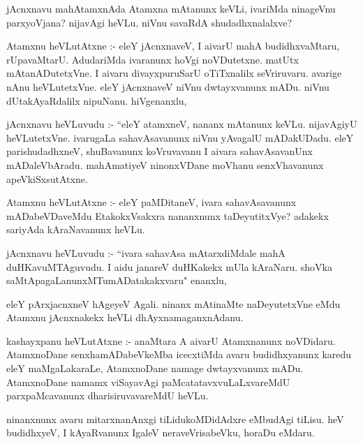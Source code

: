 \documentclass{article}
\begin{document}
\begin{mn}
jAcnxnavu mahAtamxnAda Atamxna mAtanunx keVLi, ivariMda ninageVnu parxyoVjana?
 nijavAgi heVLu, niVnu savaRdA shudadhxnalalxve?
\end{mn}

\begin{mn}Atamxnu heVLutAtxne :- eleY jAcnxnaveV, I aivarU mahA budidhxvaMtaru, 
rUpavaMtarU.  AdudariMda ivaranunx hoVgi noVDutetxne. matUtx mAtanADutetxVne.  
I aivaru divayxpuruSarU oTiTxnalilx seVriruvaru. avarige nAnu heVLutetxVne. 
 eleY jAcnxnaveV niVnu  dwtayxvanunx mADu. niVnu dUtakAyaRdalilx nipuNanu. hiVgenanxlu,
\end{mn}

\begin{mn}
jAcnxnavu heVLuvudu :- ``eleY atamxneV, nananx mAtanunx keVLu. nijavAgiyU
 heVLutetxVne.  ivarugaLa sahavAsavanunx niVnu yAvagalU mADakUDadu.  eleY 
 parishudadhxneV, shuBavanunx koVruvavanu I aivara sahavAsavanUnx  mADaleVbAradu.
  mahAmatiyeV ninonxVDane moVhanu senxVhavanunx apeVkiSxsutAtxne.
\end{mn}

\begin{mn}
Atamxnu heVLutAtxne :- eleY paMDitaneV, ivara  sahavAsavanunx mADabeVDaveMdu 
EtakokxVsakxra  nananxnunx taDeyutitxVye? adakekx sariyAda kAraNavanunx heVLu.
\end{mn}

\begin{mn}
jAcnxnavu heVLuvudu :- ``ivara   sahavAsa mAtarxdiMdale mahA duHKavuMTAguvudu.
 I aidu janareV duHKakekx mUla kAraNaru. shoVka saMtApagaLanunxMTumADatakakxvaru" enanxlu,
\end{mn}

\begin{mn}
eleY pArxjacnxneV hAgeyeV Agali. ninanx mAtinaMte naDeyutetxVne eMdu Atamxnu 
jAcnxnakekx heVLi dhAyxnamaganxnAdanu. 
\end{mn}

\begin{mn}
kashayxpanu heVLutAtxne :- anaMtara A aivarU Atamxnanunx noVDidaru. 
AtamxnoDane senxhamADabeVkeMba icecxtiMda avaru budidhxyanunx karedu eleY
maMgaLakaraLe, AtamxnoDane namage dwtayxvanunx mADu. AtamxnoDane namamx 
viSayavAgi paMcatatavxvuLaLxvareMdU parxpaMcavanunx dharisiruvavareMdU heVLu.
\end{mn}

\begin{mn}
ninanxnunx avaru mitarxnanAnxgi tiLidukoMDidAdxre eMbudAgi tiLisu. heV 
 budidhxyeV, I kAyaRvanunx IgaleV neraveVrisabeVku, horaDu eMdaru.
\end{mn}
\end{document}
